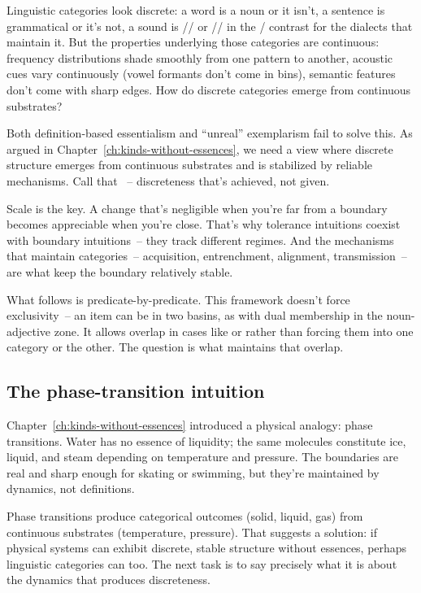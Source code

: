 Linguistic categories look discrete: a word is a noun or it isn't, a sentence is grammatical or it's not, a sound is // or // in the / contrast for the dialects that maintain it. But the properties underlying those categories are continuous: frequency distributions shade smoothly from one pattern to another, acoustic cues vary continuously (vowel formants don't come in bins), semantic features don't come with sharp edges. How do discrete categories emerge from continuous substrates?

Both definition-based essentialism and \enquote{unreal} exemplarism fail to solve this. As argued in Chapter~\ref{ch:kinds-without-essences}, we need a view where discrete structure emerges from continuous substrates and is stabilized by reliable mechanisms. Call that ~-- discreteness that's achieved, not given.

Scale is the key. A change that's negligible when you're far from a boundary becomes appreciable when you're close. That's why tolerance intuitions coexist with boundary intuitions~-- they track different regimes. And the mechanisms that maintain categories~-- acquisition, entrenchment, alignment, transmission~-- are what keep the boundary relatively stable.

What follows is predicate-by-predicate. This framework doesn't force exclusivity~-- an item can be in two basins, as with dual membership in the noun-adjective zone. It allows overlap in cases like  or  rather than forcing them into one category or the other. The question is what maintains that overlap.

\subsection{The phase-transition intuition}
\label{subsec:5:phase-intuition}

Chapter~\ref{ch:kinds-without-essences} introduced a physical analogy: phase transitions. Water has no essence of liquidity; the same molecules constitute ice, liquid, and steam depending on temperature and pressure. The boundaries are real and sharp enough for skating or swimming, but they're maintained by dynamics, not definitions.

Phase transitions produce categorical outcomes (solid, liquid, gas) from continuous substrates (temperature, pressure). That suggests a solution: if physical systems can exhibit discrete, stable structure without essences, perhaps linguistic categories can too. The next task is to say precisely what it is about the dynamics that produces discreteness.

